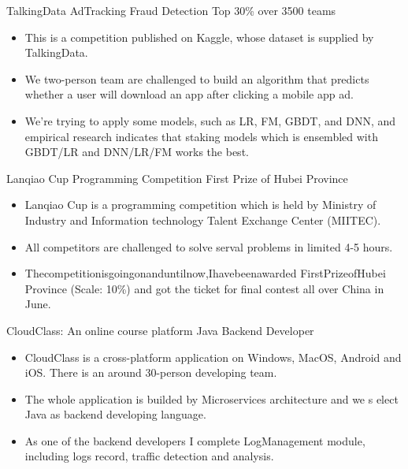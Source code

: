 \documentclass[letterpaper]{twentysecondcv} %
\begin{document}
\begin{CJK*}{UTF8}{gbsn}
\begin{twentyshort}
		{\quad TalkingData AdTracking Fraud Detection}
		{Top 30\% over 3500 teams}
		{
			\begin{itemize}
				\item This is a competition published on Kaggle, whose dataset is supplied by TalkingData.
				\item We two-person team are challenged to build an algorithm that predicts whether a user will download an app after clicking a mobile app ad.
				\item We're trying to apply some models, such as LR, FM, GBDT, and DNN, 
				and empirical research indicates that staking models which is ensembled with 
				GBDT/LR and DNN/LR/FM works the best.
			\end{itemize}
		}
		{\quad Lanqiao Cup Programming Competition}
		{First Prize of Hubei Province}
		{
			\begin{itemize}
				\item Lanqiao Cup is a programming competition which is held by Ministry of Industry and Information technology Talent Exchange Center (MIITEC).
				\item All competitors are challenged to solve serval problems in limited 4-5 hours.
				\item Thecompetitionisgoingonanduntilnow,Ihavebeenawarded FirstPrizeofHubei Province (Scale: 10\%) and got the ticket for final contest all over China in June.
			\end{itemize}
		}
		{\quad CloudClass: An online course platform}
		{Java Backend Developer}
		{
			\begin{itemize}
				\item CloudClass is a cross-platform application on Windows, MacOS, Android and iOS. There is an around 30-person developing team.
				\item The whole application is builded by Microservices architecture and we s elect Java as backend developing language.
				\item As one of the backend developers I complete LogManagement module, including logs record, traffic detection and analysis.
			\end{itemize}
		}
\end{twentyshort}



\end{CJK*}
\end{document}
